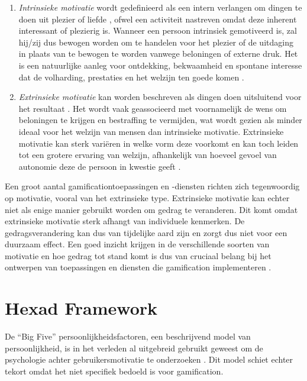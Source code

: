 \begin{enumerate}[label=(\arabic*)]
    \item \textit{Intrinsieke motivatie} wordt gedefinieerd als een intern verlangen om dingen te doen uit plezier of liefde \autocite{AlMarshedi2015}, ofwel een activiteit nastreven omdat deze inherent interessant of plezierig is. Wanneer een persoon intrinsiek gemotiveerd is, zal hij/zij dus bewogen worden om te handelen voor het plezier of de uitdaging in plaats van te bewogen te worden vanwege beloningen of externe druk. Het is een natuurlijke aanleg voor ontdekking, bekwaamheid en spontane interesse dat de volharding, prestaties en het welzijn ten goede komen \autocite{Dahlstrom2018}. 
    \item \textit{Extrinsieke motivatie} kan worden beschreven als dingen doen uitsluitend voor het resultaat \autocite{AlMarshedi2015}. Het wordt vaak geassocieerd met voornamelijk de wens om beloningen te krijgen en bestraffing te vermijden, wat wordt gezien als minder ideaal voor het welzijn van mensen dan intrinsieke motivatie. Extrinsieke motivatie kan sterk variëren in welke vorm deze voorkomt en kan toch leiden tot een grotere ervaring van welzijn, afhankelijk  van hoeveel gevoel van autonomie deze de persoon in kwestie geeft \autocite{Dahlstrom2018}.
\end{enumerate}

Een groot aantal gamificationtoepassingen en -diensten richten zich tegenwoordig op motivatie, vooral van het extrinsieke type. Extrinsieke motivatie kan echter niet als enige manier gebruikt worden om gedrag te veranderen. Dit komt omdat extrinsieke motivatie sterk afhangt van individuele kenmerken. De gedragsverandering kan dus van tijdelijke aard zijn en zorgt dus niet voor een duurzaam effect. Een goed inzicht krijgen in de verschillende soorten van motivatie en hoe gedrag tot stand komt is dus van cruciaal belang bij het ontwerpen van toepassingen en diensten die gamification implementeren \autocite{AlMarshedi2015}.

\section{Hexad Framework}

De ``Big Five'' persoonlijkheidsfactoren, een beschrijvend model van persoonlijkheid, is in het verleden al uitgebreid gebruikt geweest om de psychologie achter gebruikersmotivatie te onderzoeken \autocite{Yuan2016}. Dit model schiet echter tekort omdat het niet specifiek bedoeld is voor gamification.

